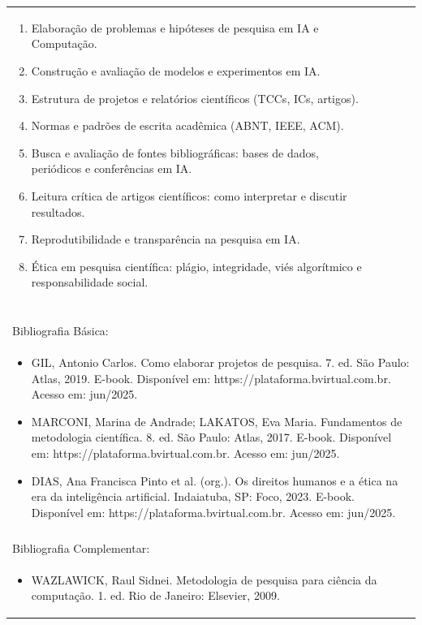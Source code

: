\documentclass[11pt]{article}
\begin{document}
\begin{center}
\begin{longtable}{|p{4cm}|p{4cm}|p{4cm}|p{4cm}|}
{\begin{enumerate}
\item Elaboração de problemas e hipóteses de pesquisa em IA e Computação.
\item Construção e avaliação de modelos e experimentos em IA.
\item Estrutura de projetos e relatórios científicos (TCCs, ICs, artigos).
\item Normas e padrões de escrita acadêmica (ABNT, IEEE, ACM).
\item Busca e avaliação de fontes bibliográficas: bases de dados, periódicos e conferências em IA.
\item Leitura crítica de artigos científicos: como interpretar e discutir resultados.
\item Reprodutibilidade e transparência na pesquisa em IA.
\item Ética em pesquisa científica: plágio, integridade, viés algorítmico e responsabilidade social.\end{enumerate}}\\
\multicolumn{4}{|p{16cm}|}{}\\
\multicolumn{4}{|p{16cm}|}{}\\
\multicolumn{4}{|p{16cm}|}{\vspace{-1cm}}\\
\multicolumn{4}{|p{16cm}|}{}\\
\hline
\multicolumn{4}{|p{16cm}|}{Bibliografia Básica:}\\
\multicolumn{4}{|p{16cm}|}{%
\begin{itemize}\item GIL, Antonio Carlos. Como elaborar projetos de pesquisa. 7. ed. São Paulo: Atlas, 2019. E-book. Disponível em: https://plataforma.bvirtual.com.br. Acesso em: jun/2025.
\item MARCONI, Marina de Andrade; LAKATOS, Eva Maria. Fundamentos de metodologia científica. 8. ed. São Paulo: Atlas, 2017. E-book. Disponível em: https://plataforma.bvirtual.com.br. Acesso em: jun/2025.
\item DIAS, Ana Francisca Pinto et al. (org.). Os direitos humanos e a ética na era da inteligência artificial. Indaiatuba, SP: Foco, 2023. E-book. Disponível em: https://plataforma.bvirtual.com.br. Acesso em: jun/2025.\end{itemize}}\\
\multicolumn{4}{|p{16cm}|}{}\\
\hline
\multicolumn{4}{|p{16cm}|}{Bibliografia Complementar:}\\
\multicolumn{4}{|p{16cm}|}{%
\begin{itemize}\item WAZLAWICK, Raul Sidnei. Metodologia de pesquisa para ciência da computação. 1. ed. Rio de Janeiro: Elsevier, 2009.

\end{itemize}}
\end{longtable}
\end{center}
\end{document}

